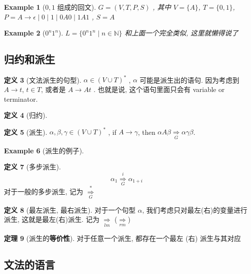 \documentclass[12pt]{ctexart}
\theoremstyle{definition}
\theoremstyle{definition}
\newtheorem{definition}{定义}[section]
\newtheorem{thm}[definition]{定理}
\theoremstyle{plain}
\newtheorem{exam}[definition]{Example}
\theoremstyle{remark}
\begin{document}
\begin{exam}[\(0,1\) 组成的回文]
	\(G = (V , T , P , S ) \) , 其中 \(V = \{ A \} \), \(T = \{ 0 , 1 \} \), \(P = A \to \epsilon \mid 0 \mid 1\mid  0A 0 \mid 1 A1\) , \(S = A\)
\end{exam}
\begin{exam}[\(0 ^{n}1 ^{n}\)]
	\(L = \{  0 ^{ n} 1 ^{n} \mid n \in \mathbb{N} \} \)
	和上面一个完全类似, 这里就懒得说了
\end{exam}

\subsection{归约和派生}
\begin{definition}[文法派生的句型]
\(\alpha \in (V \cup T ) ^{*} \) , \(\alpha\) 可能是派生出的语句. 
因为考虑到 \(A \to t\), \(t \in T\), 或者是 \(A \to A t \) . 也就是说, 这个语句里面只会有 variable or terminator.
\end{definition}

\begin{definition}[归约]
\end{definition}

\begin{definition}[派生]
	\(\alpha ,\beta , \gamma \in (V \cup T ) ^{*}\) , if \(A \to \gamma\), then \( \alpha A\beta \underset{G}{\Rightarrow}\alpha \gamma\beta\). 
\end{definition}
\begin{exam}[派生的例子]
\end{exam}

\begin{definition}[多步派生]
	\begin{equation}
		\alpha_{1} \overset{i}{\underset{G}{\Rightarrow}} \alpha _{1 + i}
	\end{equation}
	对于一般的多步派生, 记为 \(\overset{*}{\underset{G}{\Rightarrow}}\)
\end{definition}

\begin{definition}[最左派生, 最右派生]
	对于一个句型 \(\alpha\), 我们考虑只对最左(右)的变量进行派生, 这就是最左(右)派生. 记为 \(\underset{lm}{\Rightarrow}\) (\(\underset{rm}{\Rightarrow}\))
\end{definition}
\begin{thm}[派生的\textbf{等价性}]
对于任意一个派生, 都存在一个最左 (右) 派生与其对应
\end{thm}

\subsection{文法的语言}
\end{document}
